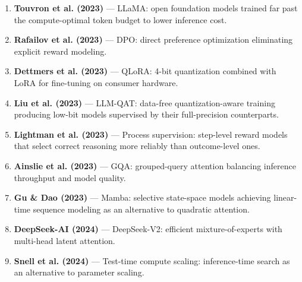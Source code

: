 \begin{enumerate}
\item \textbf{Touvron et al. (2023)} --- LLaMA: open foundation models trained far past the compute-optimal token budget to lower inference cost.

\item \textbf{Rafailov et al. (2023)} --- DPO: direct preference optimization eliminating explicit reward modeling.

\item \textbf{Dettmers et al. (2023)} --- QLoRA: 4-bit quantization combined with LoRA for fine-tuning on consumer hardware.

\item \textbf{Liu et al. (2023)} --- LLM-QAT: data-free quantization-aware training producing low-bit models supervised by their full-precision counterparts.

\item \textbf{Lightman et al. (2023)} --- Process supervision: step-level reward models that select correct reasoning more reliably than outcome-level ones.

\item \textbf{Ainslie et al. (2023)} --- GQA: grouped-query attention balancing inference throughput and model quality.

\item \textbf{Gu \& Dao (2023)} --- Mamba: selective state-space models achieving linear-time sequence modeling as an alternative to quadratic attention.

\item \textbf{DeepSeek-AI (2024)} --- DeepSeek-V2: efficient mixture-of-experts with multi-head latent attention.

\item \textbf{Snell et al. (2024)} --- Test-time compute scaling: inference-time search as an alternative to parameter scaling.
\end{enumerate}
